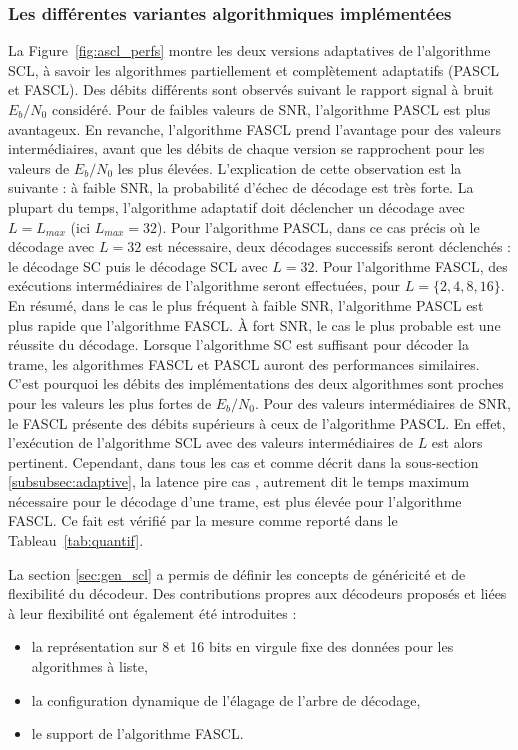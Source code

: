 \subsubsection{Les différentes variantes algorithmiques implémentées}
La Figure~\ref{fig:ascl_perfs} montre les deux versions adaptatives de l'algorithme SCL, à savoir les algorithmes partiellement et complètement adaptatifs (PASCL et FASCL). Des débits différents sont observés suivant le rapport signal à bruit $E_b/N_0$ considéré. Pour de faibles valeurs de SNR, l'algorithme PASCL est plus avantageux. En revanche, l'algorithme FASCL prend l'avantage pour des valeurs intermédiaires, avant que les débits de chaque version se rapprochent pour les valeurs de $E_b/N_0$ les plus élevées.
L'explication de cette observation est la suivante : à faible SNR, la probabilité d'échec de décodage est très forte. La plupart du temps, l'algorithme adaptatif doit déclencher un décodage avec $L=L_{max}$ (ici $L_{max}=32$). Pour l'algorithme PASCL, dans ce cas précis où le décodage avec $L=32$ est nécessaire, deux décodages successifs seront déclenchés : le décodage SC puis le décodage SCL avec $L=32$. Pour l'algorithme FASCL, des exécutions intermédiaires de l'algorithme seront effectuées, pour $L=\{2,4,8,16\}$. En résumé, dans le cas le plus fréquent à faible SNR, l'algorithme PASCL est plus rapide que l'algorithme FASCL.
\`A fort SNR, le cas le plus probable est une réussite du décodage. Lorsque l'algorithme SC est suffisant pour décoder la trame, les algorithmes FASCL et PASCL auront des performances similaires. C'est pourquoi les débits des implémentations des deux algorithmes sont proches pour les valeurs les plus fortes de $E_b/N_0$. Pour des valeurs intermédiaires de SNR, le FASCL présente des débits supérieurs à ceux de l'algorithme PASCL. En effet, l'exécution de l'algorithme SCL avec des valeurs intermédiaires de $L$ est alors pertinent. Cependant, dans tous les cas et comme décrit dans la sous-section \ref{subsubsec:adaptive}, la latence \og pire cas \fg, autrement dit le temps maximum nécessaire pour le décodage d'une trame, est plus élevée pour l'algorithme FASCL. Ce fait est vérifié par la mesure comme reporté dans le Tableau~\ref{tab:quantif}.

La section \ref{sec:gen_scl} a permis de définir les concepts de généricité et de flexibilité du décodeur. Des contributions propres aux décodeurs proposés et liées à leur flexibilité ont également été introduites :

\begin{itemize}
  \item la représentation sur 8 et 16 bits en virgule fixe des données pour les algorithmes à liste,
  \item la configuration dynamique de l'élagage de l'arbre de décodage,
  \item le support de l'algorithme FASCL.
\end{itemize}

